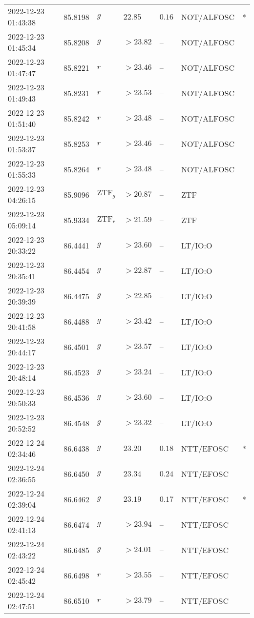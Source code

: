 \documentclass{nature_plusfigure}
\begin{document}
\begin{supplement}
\begin{center}
\begin{longtable}{lllllll}
2022-12-23 01:43:38 & 85.8198 & $g$ & $22.85$ & $0.16$ & NOT/ALFOSC & * \\ 
2022-12-23 01:45:34 & 85.8208 & $g$ & $>23.82$ & -- & NOT/ALFOSC &  \\ 
2022-12-23 01:47:47 & 85.8221 & $r$ & $>23.46$ & -- & NOT/ALFOSC &  \\ 
2022-12-23 01:49:43 & 85.8231 & $r$ & $>23.53$ & -- & NOT/ALFOSC &  \\ 
2022-12-23 01:51:40 & 85.8242 & $r$ & $>23.48$ & -- & NOT/ALFOSC &  \\ 
2022-12-23 01:53:37 & 85.8253 & $r$ & $>23.46$ & -- & NOT/ALFOSC &  \\ 
2022-12-23 01:55:33 & 85.8264 & $r$ & $>23.48$ & -- & NOT/ALFOSC &  \\ 
2022-12-23 04:26:15 & 85.9096 & $\mathrm{ZTF}_{g}$ & $>20.87$ & -- & ZTF &  \\ 
2022-12-23 05:09:14 & 85.9334 & $\mathrm{ZTF}_{r}$ & $>21.59$ & -- & ZTF &  \\ 
2022-12-23 20:33:22 & 86.4441 & $g$ & $>23.60$ & -- & LT/IO:O &  \\ 
2022-12-23 20:35:41 & 86.4454 & $g$ & $>22.87$ & -- & LT/IO:O &  \\ 
2022-12-23 20:39:39 & 86.4475 & $g$ & $>22.85$ & -- & LT/IO:O &  \\ 
2022-12-23 20:41:58 & 86.4488 & $g$ & $>23.42$ & -- & LT/IO:O &  \\ 
2022-12-23 20:44:17 & 86.4501 & $g$ & $>23.57$ & -- & LT/IO:O &  \\ 
2022-12-23 20:48:14 & 86.4523 & $g$ & $>23.24$ & -- & LT/IO:O &  \\ 
2022-12-23 20:50:33 & 86.4536 & $g$ & $>23.60$ & -- & LT/IO:O &  \\ 
2022-12-23 20:52:52 & 86.4548 & $g$ & $>23.32$ & -- & LT/IO:O &  \\ 
2022-12-24 02:34:46 & 86.6438 & $g$ & $23.20$ & $0.18$ & NTT/EFOSC & * \\ 
2022-12-24 02:36:55 & 86.6450 & $g$ & $23.34$ & $0.24$ & NTT/EFOSC &  \\ 
2022-12-24 02:39:04 & 86.6462 & $g$ & $23.19$ & $0.17$ & NTT/EFOSC & * \\ 
2022-12-24 02:41:13 & 86.6474 & $g$ & $>23.94$ & -- & NTT/EFOSC &  \\ 
2022-12-24 02:43:22 & 86.6485 & $g$ & $>24.01$ & -- & NTT/EFOSC &  \\ 
2022-12-24 02:45:42 & 86.6498 & $r$ & $>23.55$ & -- & NTT/EFOSC &  \\ 
2022-12-24 02:47:51 & 86.6510 & $r$ & $>23.79$ & -- & NTT/EFOSC &  \\ 

\end{longtable}
\end{center}
\end{supplement}
\end{document}
